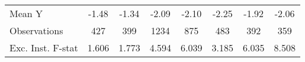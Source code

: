 {\begin{tabular}{l*{7}{c}}
\midrule
Mean Y      &       -1.48         &       -1.34         &       -2.09         &       -2.10         &       -2.25         &       -1.92         &       -2.06         \\
Observations&         427         &         399         &        1234         &         875         &         483         &         392         &         359         \\
Exc. Inst. F-stat&       1.606         &       1.773         &       4.594         &       6.039         &       3.185         &       6.035         &       8.508         \\
\bottomrule
\end{tabular}
}
